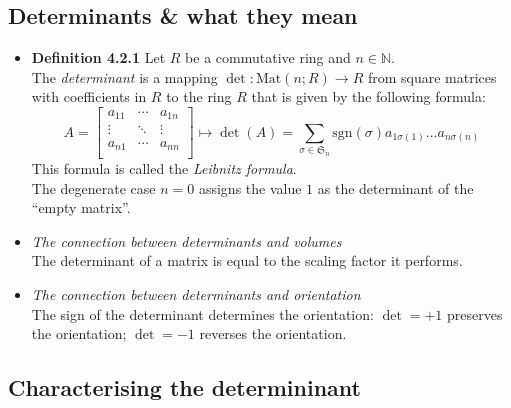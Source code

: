 \documentclass[11pt,a4paper]{article}
\begin{document}
\subsection{Determinants \& what they mean}

\begin{itemize}
    \item \textbf{Definition 4.2.1}
        Let $R$ be a commutative ring and $n \in \mathbb{N}$. \\
        The \emph{determinant} is a mapping
        $\det : \mathrm{Mat}(n;R) \to R$ from square matrices with coefficients in $R$
        to the ring $R$ that is given by the following formula:
        \[
            A =
            \begin{bmatrix}
                a_{11} & \cdots & a_{1n} \\
                \vdots & \ddots & \vdots \\
                a_{n1} & \cdots & a_{nn} \\
            \end{bmatrix}
            \mapsto \det (A) =
            \sum_{\sigma \in \mathfrak{S}_n}
            \mathrm{sgn}(\sigma) a_{1\sigma(1)} \ldots a_{n\sigma(n)}
        \]
        This formula is called the \emph{Leibnitz formula}. \\
        The degenerate case $n=0$ assigns the value $1$ as the determinant of the ``empty matrix''.

    \item \emph{The connection between determinants and volumes} \\
        The determinant of a matrix is equal to the scaling factor it performs.

    \item \emph{The connection between determinants and orientation} \\
        The sign of the determinant determines the orientation:
        $\det = +1$ preserves the orientation;
        $\det = -1$ reverses the orientation.

\end{itemize}

\subsection{Characterising the determininant}
\end{document}
